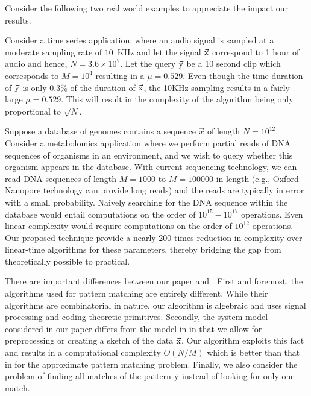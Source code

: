 	Consider the following two real world examples to appreciate the impact our results.  
	\begin{example}  Consider a time series application, where an audio signal is sampled at a moderate sampling rate of $10$~KHz and let the signal $\vec{\mathrm{x}}$ correspond to 1 hour of audio and hence, $N = 3.6 \times 10^7$. Let the query $\vec{\mathrm{y}}$ be a 10 second clip which corresponds to $M = 10^4$ resulting in a $\mu = 0.529$. Even though the time duration of $\vec{\mathrm{y}}$ is only 0.3\% of the duration of $\vec{\mathrm{x}}$, the 10KHz sampling results in a fairly large $\mu = 0.529$. This will result in the complexity of the algorithm being only proportional to $\sqrt{N}$.
	\end{example}
	\begin{example}  Suppose a database of genomes contains a sequence $\vec{x}$ of length $N=10^{12}$. Consider a metabolomics application where we perform partial reads of DNA sequences of organisms in an environment, and we wish to query whether this organism appears in the database. With current sequencing technology, we can read DNA sequences of length $M=1000$ to $M = 100000$ in length (e.g., Oxford Nanopore technology can provide long reads) and the reads are typically in error with a small probability. Naively searching for the DNA sequence within the database would entail computations on the order of $10^{15}-10^{17}$ operations. Even linear complexity would require computations on the order of $10^{12}$ operations. Our proposed technique provide a nearly 200 times reduction in complexity over linear-time algorithms for these parameters, thereby bridging the gap from theoretically possible to practical.
\end{example}
There are important differences between our paper and \cite{hassanieh2012faster,andoni2013shift,boyer1977fast,amir2004faster}. First and foremost, the algorithms used for pattern matching are entirely different. While their algorithms are combinatorial in nature, our algorithm is algebraic and uses signal processing and coding theoretic primitives. Secondly, the system model considered in our paper differs from the model in \cite{hassanieh2012faster,andoni2013shift,boyer1977fast,amir2004faster} in that we allow for preprocessing or creating a sketch of the data $\vec{\mathrm{x}}$. Our algorithm exploits this fact and results in a computational complexity $O(N/M)$ which is better than that in \cite{andoni2013shift} for the approximate pattern matching problem.  Finally, we also consider the problem of finding all matches of the pattern $\vec{\mathrm{y}}$ instead of looking for only one match.

